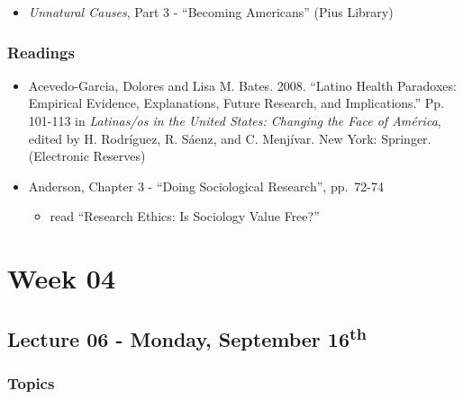 \documentclass[]{book}
\providecommand{\tightlist}{%
  \setlength{\itemsep}{0pt}\setlength{\parskip}{0pt}}
\begin{document}
\begin{itemize}
\tightlist
\item
  \emph{Unnatural Causes}, Part 3 - ``Becoming Americans'' (Pius Library)
\end{itemize}

\hypertarget{readings-5}{%
\subsubsection*{Readings}\label{readings-5}}

\begin{itemize}
\tightlist
\item
  Acevedo-Garcia, Dolores and Lisa M. Bates. 2008. ``Latino Health Paradoxes: Empirical Evidence, Explanations, Future Research, and Implications.'' Pp. 101-113 in \emph{Latinas/os in the United States: Changing the Face of América}, edited by H. Rodríguez, R. Sáenz, and C. Menjívar. New York: Springer. (Electronic Reserves)
\item
  Anderson, Chapter 3 - ``Doing Sociological Research'', pp.~72-74

  \begin{itemize}
  \tightlist
  \item
    read ``Research Ethics: Is Sociology Value Free?''
  \end{itemize}
\end{itemize}

\newpage

\hypertarget{week-04}{%
\section*{Week 04}\label{week-04}}

\hypertarget{lecture-06---monday-september-16th}{%
\subsection*{\texorpdfstring{Lecture 06 - Monday, September 16\textsuperscript{th}}{Lecture 06 - Monday, September 16th}}\label{lecture-06---monday-september-16th}}

\hypertarget{topics-6}{%
\subsubsection*{Topics}\label{topics-6}}
\end{document}
